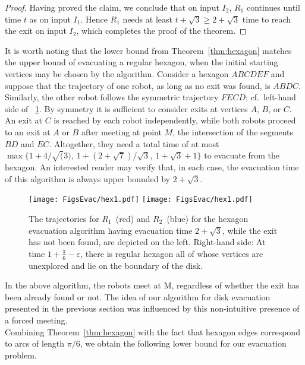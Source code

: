\documentclass[
final
]{dmtcs-episciences}
\newcommand{\RA}{\ensuremath{R_1}}
\newcommand{\RB}{\ensuremath{R_2 }}
\theoremstyle{definition}
\begin{document}
\begin{proof}
Having proved the claim, we conclude that on input $I_2$, 
$\RA$ continues until time $t$ as on input $I_1$. Hence $\RA$ needs at least $t+\sqrt{3} \geq 2+\sqrt{3}$ time to reach the exit on input $I_2$,
which completes the proof of the theorem.
\end{proof}

It is worth noting that the lower bound from Theorem~\ref{thm:hexagon} matches the upper bound of evacuating a regular hexagon, when the initial starting vertices may be chosen by the algorithm. 
Consider a hexagon $ABCDEF$ and suppose that the trajectory of one robot, as long as no exit was found, is $ABDC$. 
Similarly, the other robot follows the symmetric trajectory $FECD$; cf.\ left-hand side of \figurename~\ref{fig:hex_ub}. 
By symmetry it is sufficient to consider exits at vertices $A$, $B$, or $C$. 
An exit at $C$ is reached by each robot independently, while both robots proceed to an exit at $A$ or $B$ after meeting at point $M$, the intersection of the segments $BD$ and $EC$. 
Altogether, they need a total time of at most $\max\{1 + 4/\sqrt(3),~ 1 + (2+\sqrt{7})/\sqrt{3},~ 1+\sqrt{3}+1\}$ to evacuate from the hexagon. 
An interested reader may verify that, in each case, the evacuation time of this algorithm is always upper bounded by $2+\sqrt{3}$.


\begin{figure}[!ht]
                \centering
 \vspace{-2ex}
 \texttt{[image: FigsEvac/hex1.pdf]} \hspace{1cm}
                \texttt{[image: FigsEvac/hex1.pdf]}
				\caption{The trajectories for \RA~(red) and \RB~(blue) for the hexagon evacuation algorithm having evacuation time $2+\sqrt{3}$, 					while the exit has not been found, are depicted on the left.
					Right-hand side: At time $1 + \frac{\pi}{6} - \varepsilon$, there is regular hexagon all of whose vertices are unexplored and lie on the boundary of the disk.
				}
				\label{fig:hex_ub}
\end{figure}

In the above algorithm, the robots meet at M, regardless of  whether the exit has been already found or not. 
The idea of our algorithm for disk evacuation presented in the previous section was influenced by this non-intuitive presence of a forced meeting. \\
Combining Theorem~\ref{thm:hexagon} with the fact that hexagon edges correspond to arcs of length $\pi/6$, we obtain the following lower bound for our evacuation problem.
\end{document}
